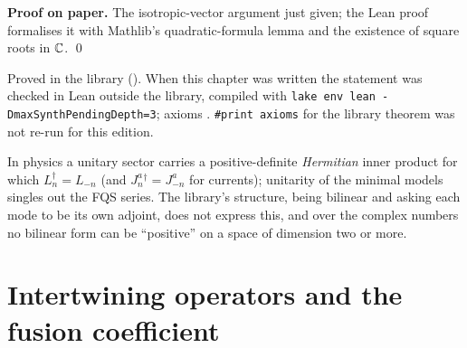 \textbf{Proof on paper.} The isotropic-vector argument just given; the Lean proof formalises it with Mathlib's
quadratic-formula lemma  and the existence of square roots in ${\mathbb{C}}$. \qed

\begin{status}
Proved in the library (). When this chapter was written the statement was checked in Lean
outside the library, compiled with \texttt{lake env lean -DmaxSynthPendingDepth=3}; axioms . \texttt{\#print axioms} for the library theorem was not re-run for this edition.
\end{status}

\begin{physics}
In physics a unitary sector carries a positive-definite \emph{Hermitian} inner product for which $L_n^\dagger = L_{-n}$
(and $J^a_n{}^\dagger = J^a_{-n}$ for currents); unitarity of the minimal models singles out the FQS series. The library's
structure, being bilinear and asking each mode to be its own adjoint, does not express this, and over the complex
numbers no bilinear form can be ``positive'' on a space of dimension two or more.
\end{physics}

\section{Intertwining operators and the fusion coefficient}\label{l12:sec:fusion}


